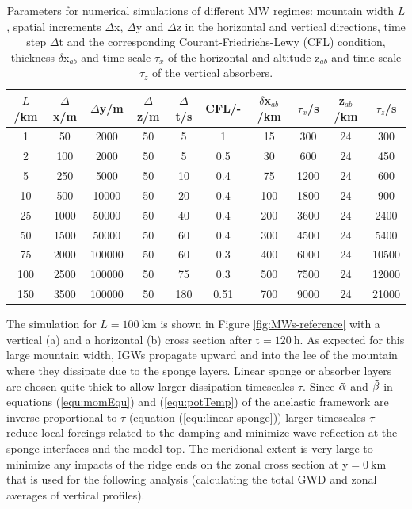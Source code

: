 \begin{table}[t]
    \centering
    \caption{Parameters for numerical simulations of different MW regimes: mountain width $L$, spatial increments $\Delta$x, $\Delta$y and $\Delta$z in the horizontal and vertical directions, time step $\Delta$t and the corresponding Courant-Friedrichs-Lewy (CFL) condition, thickness $\delta$x$_{ab}$ and time scale $\tau_x$ of the horizontal and altitude z$_{ab}$ and time scale $\tau_z$ of the vertical absorbers.}
    \begin{tabular}{@{}cccccccccc@{}}
    \toprule
    $L$/km & $\Delta$x/m & $\Delta$y/m & $\Delta$z/m & $\Delta$t/s & CFL/- & $\delta$x$_{ab}$/km & $\tau_x$/s  & z$_{ab}$/km & $\tau_z$/s \\ \midrule[1pt]
    1   & 50 & 2000 & 50 & 5 & 1 & 15  & 300  & 24 & 300   \\
    2   & 100 & 2000 & 50 & 5 & 0.5  & 30  & 600  & 24 & 450   \\
    5   & 250 & 5000 & 50 & 10 & 0.4 & 75  & 1200 & 24 & 600  \\
    10  & 500 & 10000 & 50 & 20 & 0.4  & 100 & 1800 & 24 & 900  \\
    25  & 1000 & 50000 & 50 & 40 & 0.4  & 200 & 3600 & 24 & 2400  \\
    50  & 1500 & 50000 & 50 & 60 & 0.4  & 300 & 4500 & 24 & 5400  \\
    75  & 2000 & 100000 & 50 & 60 & 0.3 & 400 & 6000 & 24 & 10500 \\
    100 & 2500 & 100000 & 50 & 75 & 0.3  & 500 & 7500 & 24 & 12000 \\
    150 & 3500 & 100000 & 50 & 180 & 0.51 & 700 & 9000 & 24 & 21000 \\
    \bottomrule
    \end{tabular}
    \label{tab:linearRegimes}
\end{table}
The simulation for $L=\SI{100}{\kilo\meter}$ is shown in Figure \ref{fig:MWs-reference} with a vertical (a) and a horizontal (b) cross section after t$=\SI{120}{\hour}$. As expected for this large mountain width, IGWs propagate upward and into the lee of the mountain where they dissipate due to the sponge layers. Linear sponge or absorber layers are chosen quite thick to allow larger dissipation timescales $\tau$. Since $\Tilde{\alpha}$ and $\Tilde{\beta}$ in equations (\ref{equ:momEqu}) and (\ref{equ:potTemp}) of the anelastic framework are inverse proportional to $\tau$ (equation (\ref{equ:linear-sponge})) larger timescales $\tau$ reduce local forcings related to the damping and minimize wave reflection at the sponge interfaces and the model top. The meridional extent is very large to minimize any impacts of the ridge ends on the zonal cross section at y$=\SI{0}{\kilo\meter}$ that is used for the following analysis (calculating the total GWD and zonal averages of vertical profiles).
